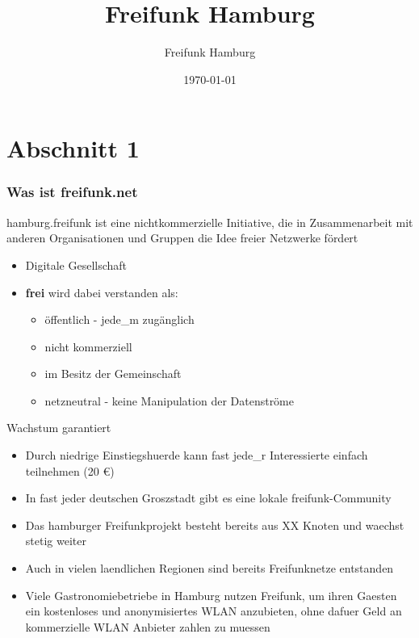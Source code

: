 \documentclass[aspectratio=43]{beamer}
\title{Freifunk Hamburg}
\author{Freifunk Hamburg}
\date{\today}
\begin{document}
\maketitle
\frame{\tableofcontents[currentsection]}

\section{Abschnitt 1}
\begin{frame} %
  \frametitle{Was ist freifunk.net} %
  hamburg.freifunk ist eine nichtkommerzielle Initiative, die in Zusammenarbeit mit anderen Organisationen und Gruppen die Idee freier Netzwerke fördert
  \begin{itemize}
	\item Digitale Gesellschaft	
  \end{itemize}
\end{frame}

\begin{frame}
\begin{itemize}
	\item \textbf{frei} wird dabei verstanden als:
	\begin{itemize}
		\item öffentlich - jede\_m zugänglich
		\item nicht kommerziell
		\item im Besitz der Gemeinschaft
		\item netzneutral - keine Manipulation der Datenströme
	\end{itemize}
  \end{itemize}
\end{frame}


\begin{frame}{Wachstum garantiert}
	\begin{itemize}
		\item Durch niedrige Einstiegshuerde kann fast jede\_r Interessierte einfach teilnehmen (20 €)
		\item In fast jeder deutschen Groszstadt gibt es eine lokale freifunk-Community
		\item Das hamburger Freifunkprojekt besteht bereits aus XX Knoten und waechst stetig weiter %
		\item Auch in vielen laendlichen Regionen sind bereits Freifunknetze entstanden
		\item Viele Gastronomiebetriebe in Hamburg nutzen Freifunk, um ihren Gaesten ein kostenloses und anonymisiertes WLAN anzubieten, ohne dafuer Geld an kommerzielle WLAN Anbieter zahlen zu muessen %
	\end{itemize}
\end{frame}
\end{document}
